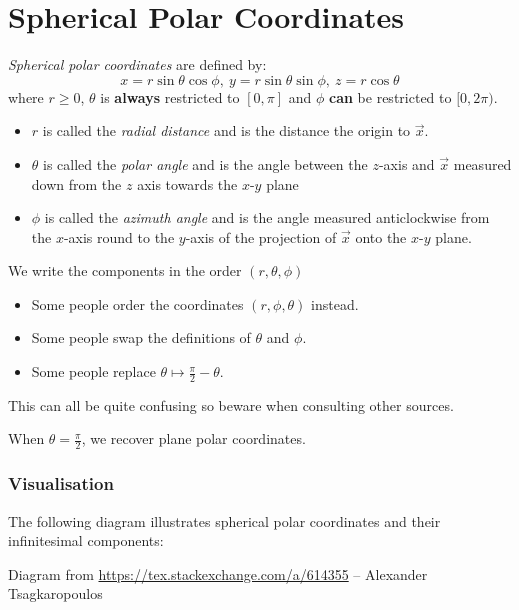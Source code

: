 \documentclass[../main.tex]{subfiles}
\begin{document}
\section{Spherical Polar Coordinates}
\label{sphericalPolar}
\begin{definition}
  \textit{Spherical polar coordinates} are defined by:
  \[
    x = r \sin \theta \cos \phi,\ y = r \sin \theta \sin \phi,\ z = r \cos \theta
  \]
  where $r \geq 0$, $\theta$ is \textbf{always} restricted to $[0, \pi]$ and $\phi$ \textbf{can} be restricted to $[0, 2\pi)$.

  \begin{itemize}
    \item $r$ is called the \textit{radial distance} and is the distance the origin to $\vec{x}$.
    \item $\theta$ is called the \textit{polar angle} and is the angle between the $z$-axis and $\vec{x}$ measured down from the $z$ axis towards the $x$-$y$ plane
    \item $\phi$ is called the \textit{azimuth angle} and is the angle measured anticlockwise from the $x$-axis round to the $y$-axis of the projection of $\vec{x}$ onto the $x$-$y$ plane.
  \end{itemize}
  We write the components in the order $(r, \theta, \phi)$
\end{definition}
\begin{remark}
  \begin{itemize}
    \item Some people order the coordinates $(r, \phi, \theta)$ instead.
    \item Some people swap the definitions of $\theta$ and $\phi$.
    \item Some people replace $\theta \mapsto \frac{\pi}{2} - \theta$.
  \end{itemize}
  This can all be quite confusing so beware when consulting other sources.
\end{remark}
\begin{remark}
  When $\theta = \frac{\pi}{2}$, we recover plane polar coordinates.
\end{remark}
\subsubsection{Visualisation}
The following diagram illustrates spherical polar coordinates and their infinitesimal components:
\begin{center}
  \par
  \footnotesize{Diagram from \url{https://tex.stackexchange.com/a/614355} -- Alexander Tsagkaropoulos}
\end{center}
\end{document}
